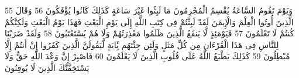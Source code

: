 \documentclass[20pt,a4paper]{article}
\begin{document}
{\tiny\colorbox{cl_aya}{55}} وَيَوْمَ تَقُومُ السَّاعَةُ يُقْسِمُ الْمُجْرِمُونَ مَا لَبِثُوا غَيْرَ سَاعَةٍ كَذَلِكَ كَانُوا يُؤْفَكُونَ
{\tiny\colorbox{cl_aya}{56}} وَقَالَ الَّذِينَ أُوتُوا الْعِلْمَ وَالْإِيمَنَ لَقَدْ لَبِثْتُمْ فِى كِتَبِ اللَّهِ إِلَى يَوْمِ الْبَعْثِ فَهَذَا يَوْمُ الْبَعْثِ وَلَكِنَّكُمْ كُنتُمْ لَا تَعْلَمُونَ
{\tiny\colorbox{cl_aya}{57}} فَيَوْمَئِذٍ لَّا يَنفَعُ الَّذِينَ ظَلَمُوا مَعْذِرَتُهُمْ وَلَا هُمْ يُسْتَعْتَبُونَ
{\tiny\colorbox{cl_aya}{58}} وَلَقَدْ ضَرَبْنَا لِلنَّاسِ فِى هَذَا الْقُرْءَانِ مِن كُلِّ مَثَلٍ وَلَئِن جِئْتَهُم بَِٔايَةٍ لَّيَقُولَنَّ الَّذِينَ كَفَرُوا إِنْ أَنتُمْ إِلَّا مُبْطِلُونَ
{\tiny\colorbox{cl_aya}{59}} كَذَلِكَ يَطْبَعُ اللَّهُ عَلَى قُلُوبِ الَّذِينَ لَا يَعْلَمُونَ
{\tiny\colorbox{cl_aya}{60}} فَاصْبِرْ إِنَّ وَعْدَ اللَّهِ حَقٌّ وَلَا يَسْتَخِفَّنَّكَ الَّذِينَ لَا يُوقِنُونَ
\end{document}
